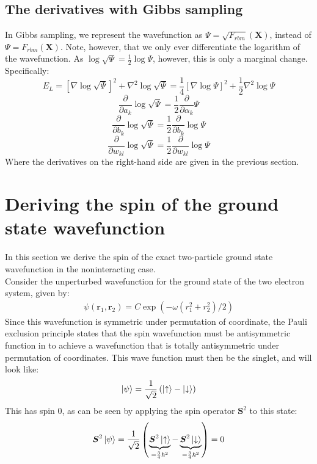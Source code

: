 \documentclass[a4paper, 10pt]{article}
\begin{document}
\begin{appendices}
	\subsection{The derivatives with Gibbs sampling}\label{ap:derivative_gibbs}
	In Gibbs sampling, we represent the wavefunction as $\Psi=\sqrt{F_{rbm}}(\boldsymbol{X})$, instead of $\Psi=F_{rbm}(\boldsymbol{X})$. Note, however, that we only ever differentiate the logarithm of the wavefunction. As $\log \sqrt{\Psi}=\frac{1}{2}\log \Psi$, however, this is only a marginal change. Specifically:
	\begin{equation}
	E_L=[\nabla \log \sqrt{\Psi}]^2 + \nabla^2 \log \sqrt{\Psi} =\frac{1}{4}[\nabla \log \Psi]^2 +\frac{1}{2}\nabla^2 \log \Psi
	\end{equation}
	\begin{equation}
	\frac{\partial }{\partial a_k}\log \sqrt{\Psi}=\frac{1}{2}\frac{\partial }{\partial \alpha_k}\Psi
	\end{equation}
	\begin{equation}
	\frac{\partial }{\partial b_k}\log \sqrt{\Psi}=\frac{1}{2}\frac{\partial }{\partial b_k}\log \Psi 
	\end{equation}
	\begin{equation}
	\frac{\partial}{\partial w_{kl}}\log \sqrt{\Psi}=\frac{1}{2}\frac{\partial}{\partial w_{kl}}\log \Psi
	\end{equation}
	Where the derivatives on the right-hand side are given in the previous section.
\section{Deriving the spin of the ground state wavefunction}\label{ap:Derivative_spin}
In this section we derive the spin of the exact two-particle ground state wavefunction in the noninteracting case.\\
\linebreak
Consider the unperturbed wavefunction for the ground state of the
two electron system, given by:
\begin{align}
\psi(\boldsymbol{r}_{1},\boldsymbol{r}_{2}) =
C\exp\left(-\omega\left(r_{1}^{2} + r_{2}^{2}\right)/2\right)
\end{align}
Since this wavefunction is symmetric under permutation of coordinate, the
Pauli exclusion principle states that the spin wavefunction must be antisymmetric function in to achieve a wavefunction that is totally antisymmetric under permutation of coordinates. This wave function must then be the singlet, and will look like:
\begin{align}
\ket{\psi} = \frac{1}{\sqrt{2}}\left(\ket{\uparrow} - \ket{\downarrow}\right)
\end{align}
This has spin $0$, as can be seen by applying the spin operator $\boldsymbol{S}^{2}$ to this state:
\begin{align}
\boldsymbol{S}^{2}\ket{\psi} = \frac{1}{\sqrt{2}}\left(
\underbrace{\boldsymbol{S}^{2}\ket{\uparrow}}_{= \frac{3}{4}\hbar^{2}} -
\underbrace{\boldsymbol{S}^{2}\ket{\downarrow}}_{= \frac{3}{4}\hbar^{2}}\right)
= 0
\end{align}
	\end{appendices}
\end{document}
